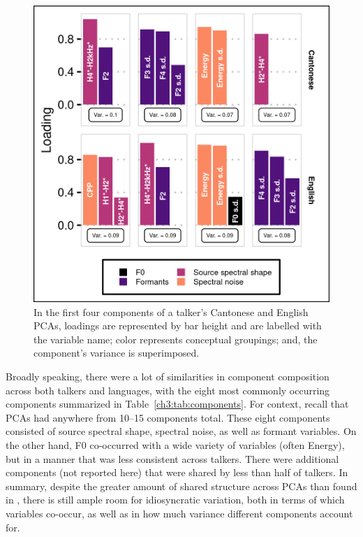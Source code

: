 \begin{figure}[htbp]
\begin{center}
\includegraphics[width=0.875\linewidth]{figures/3-VF32A_pretty.png} 
\caption{In the first four components of a talker's Cantonese and English PCAs, loadings are represented by bar height and are labelled with the variable name; color represents conceptual groupings; and, the component's variance is superimposed.}
\label{ch3:fig:VF32A}
\end{center}
\end{figure}

Broadly speaking, there were a lot of similarities in component composition across both talkers and languages, with the eight most commonly occurring components summarized in Table~\ref{ch3:tab:components}. For context, recall that PCAs had anywhere from 10--15 components total. These eight components consisted of source spectral shape, spectral noise, as well as formant variables. On the other hand, F0 co-occurred with a wide variety of variables (often Energy), but in a manner that was less consistent across talkers. There were additional components (not reported here) that were shared by less than half of talkers. In summary, despite the greater amount of shared structure across PCAs than found in \citet{lee_2019_acoustic-paper}, there is still ample room for idiosyncratic variation, both in terms of which variables co-occur, as well as in how much variance different components account for. 

